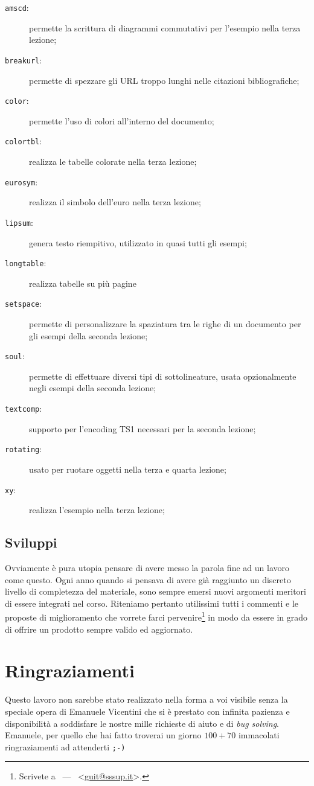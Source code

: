 \documentclass[a4paper,12pt]{article}
\newcommand{\email}[1]{{\ttfamily <\href{mailto:#1}{#1}>}}
\begin{document}
\begin{description}
	\item[\texttt{amscd}:] permette la scrittura di diagrammi
	    commutativi per l'esempio nella terza lezione;
	\item[\texttt{breakurl}:] permette di spezzare gli URL troppo
	    lunghi nelle citazioni bibliografiche;
	\item[\texttt{color}:] permette l'uso di colori all'interno
	    del documento;
	\item[\texttt{colortbl}:] realizza le tabelle colorate nella
	    terza lezione;
	\item[\texttt{eurosym}:] realizza il simbolo dell'euro nella
	    terza lezione;
	\item[\texttt{lipsum}:] genera testo riempitivo, utilizzato in
	    quasi tutti gli esempi;
	\item[\texttt{longtable}:] realizza tabelle su pi\`u pagine
	\item[\texttt{setspace}:] permette di personalizzare la
	    spaziatura tra le righe di un documento per gli esempi
	    della seconda lezione;
	\item[\texttt{soul}:] permette di effettuare diversi tipi di
	    sottolineature, usata opzionalmente negli esempi della
	    seconda lezione; 
	\item[\texttt{textcomp}:] supporto per l'encoding TS1
	    necessari per la seconda lezione;
	\item[\texttt{rotating}:] usato per ruotare oggetti nella
	    terza e quarta lezione;
	\item[\texttt{xy}:] realizza l'esempio nella terza lezione;
\end{description}

\subsection{Sviluppi}
Ovviamente \`e pura utopia pensare di avere messo la parola fine ad un
lavoro come questo. Ogni anno quando si pensava di avere gi\`a
raggiunto un discreto livello di completezza del materiale,  sono
sempre emersi nuovi argomenti meritori di essere integrati nel corso.
Riteniamo pertanto utilissimi tutti i commenti e le proposte di
miglioramento che vorrete farci pervenire\footnote{Scrivete a \GuIT\
--- \GuITtext\ \email{guit@sssup.it}.} in modo da essere in grado di
offrire un prodotto sempre valido ed aggiornato.

\section{Ringraziamenti}
Questo lavoro non sarebbe stato realizzato nella forma a voi visibile
senza la speciale opera di Emanuele Vicentini che si \`e prestato con
infinita pazienza e disponibilit\`a a soddisfare le nostre mille
richieste di aiuto e di \textit{bug solving}. Emanuele, per quello che
hai fatto troverai un giorno $100+70$ immacolati ringraziamenti ad
attenderti \texttt{;-)}
\end{document}
